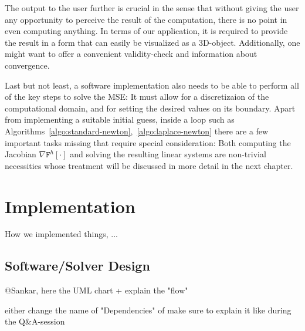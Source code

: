 \documentclass[11pt]{scrartcl}
\newcommand{\mSurfDisc}[1]{\ensuremath{\mathtt{F}^h\left[#1\right]}}
\begin{document}
The output to the user further is crucial in the sense that without giving the user any opportunity to perceive the result of the computation, there is no point in even computing anything. In terms of our application, it is required to provide the result in a form that can easily be visualized as a 3D-object. Additionally, one might want to offer a convenient validity-check and information about convergence.

Last but not least, a software implementation also needs to be able to perform all of the key steps to solve the MSE: It must allow for a discretizaion of the computational domain, and for setting the desired values on its boundary. Apart from implementing a suitable initial guess, inside a loop such as Algorithms~\ref{algo:standard-newton},~\ref{algo:laplace-newton} there are a few important tasks missing that require special consideration: Both computing the Jacobian $\nabla\mSurfDisc{\cdot}$ and solving the resulting linear systems are non-trivial necessities whose treatment will be discussed in more detail in the next chapter. 


\clearpage
\section{Implementation}

How we implemented things, ...

\subsection{Software/Solver Design}
@Sankar, here the UML chart + explain the "flow"

either change the name of "Dependencies" of make sure to explain it like during the Q\&A-session
\end{document}
